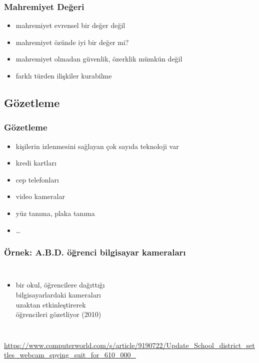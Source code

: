 \documentclass[dvipsnames]{beamer}
\theoremstyle{definition}
\theoremstyle{example}
\theoremstyle{plain}
\begin{document}
\begin{frame}
  \frametitle{Mahremiyet Değeri}

  \begin{itemize}
    \item mahremiyet evrensel bir değer değil

    \pause
    \bigskip
    \item mahremiyet özünde iyi bir değer mi?
    \smallskip
    \item mahremiyet olmadan güvenlik, özerklik mümkün değil
    \item farklı türden ilişkiler kurabilme
  \end{itemize}
\end{frame}

\subsection{Gözetleme}

\begin{frame}
  \frametitle{Gözetleme}

  \begin{itemize}
    \item kişilerin izlenmesini sağlayan çok sayıda teknoloji var

    \medskip
    \item kredi kartları
    \item cep telefonları
    \item video kameralar
    \item yüz tanıma, plaka tanıma
    \item \ldots
  \end{itemize}
\end{frame}

\begin{frame}
  \frametitle{Örnek: A.B.D. öğrenci bilgisayar kameraları}

  \begin{columns}

    \begin{itemize}
      \item bir okul, öğrencilere dağıttığı\\
        bilgisayarlardaki kameraları\\
        uzaktan etkinleştirerek\\
        öğrencileri gözetliyor (2010)
    \end{itemize}
  \end{columns}

  \medskip
  \tiny{\url{https://www.computerworld.com/s/article/9190722/Update_School_district_settles_webcam_spying_suit_for_610_000_}}\\
\end{frame}
\end{document}

